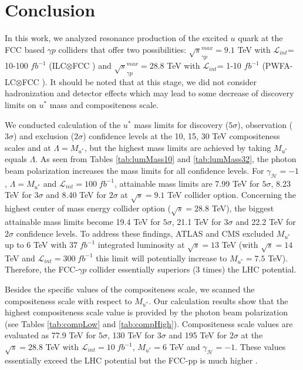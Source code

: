 \documentclass{appolb}
\begin{document}
\section{\label{sec:V}Conclusion}

In this work, we  analyzed  resonance production of the excited $u$ quark at the FCC based $\gamma p$ colliders that offer two possibilities: $\sqrt{s}^{max}_{\gamma p} = 9.1$ TeV with $\mathcal{L}_{int}$= 10-100 $fb^{-1}$ (ILC$\otimes$FCC ) and $\sqrt{s}^{max}_{\gamma p} = 28.8$ TeV with $\mathcal{L}_{int}$= 1-10 $fb^{-1}$ (PWFA-LC$\otimes$FCC ). It should be noted that at this stage, we did not consider hadronization and detector effects which may lead  to some decrease of discovery limits on $u^*$ mass and compositeness scale.

We conducted calculation of the $u^*$ mass limits for discovery ($5\sigma$), observation ($3\sigma$) and exclusion ($2\sigma$) confidence levels at the 10, 15, 30 TeV compositeness scales and at $\Lambda = M_{u^*}$, but the highest mass limits are achieved by taking $M_{u^*}$ equals  $\Lambda$. As seen from  Tables \ref{tab:lumMass10} and \ref{tab:lumMass32}, the photon beam polarization increases the mass limits for all confidence levels.  For $\gamma_{\mathcal{H}} = -1$, $\Lambda = M_{u^*}$ and $\mathcal{L}_{int} = 100 \;fb^{-1}$, attainable mass limits are  7.99 TeV for $5\sigma$, 8.23 TeV for $3\sigma$ and 8.40 TeV for $2\sigma$ at $\sqrt{s} = 9.1$ TeV collider option. Concerning the highest center of mass energy collider option ($\sqrt{s} = 28.8$ TeV),  the biggest attainable mass limits become  19.4 TeV for $5\sigma$, 21.1 TeV for $3\sigma$ and 22.2 TeV for $2\sigma$ confidence levels. To address these findings, ATLAS and CMS excluded $M_{u^*}$ up to 6 TeV with $37\;fb^{-1}$ integrated luminosity at $\sqrt{s} = 13$ TeV (with $\sqrt{s} = 14$ TeV and  $\mathcal{L}_{int} = 300 \;fb^{-1}$ this limit will potentially increase to $M_{u^*} = 7.5$ TeV). Therefore, the FCC-$\gamma p$ collider essentially superiors (3 times) the LHC potential.

Besides the specific values of the compositeness scale, we scanned the compositeness scale with respect to $M_{u^*}$. Our calculation results show that the highest compositeness scale  value is provided by the photon beam polarization (see Tables \ref{tab:compLow} and \ref{tab:compHigh}). Compositeness scale values are  evaluated as 77.9 TeV for $5\sigma$, 130 TeV for $3\sigma$ and 195 TeV for $2\sigma$ at the $\sqrt{s} = 28.8 $ TeV with  $\mathcal{L}_{int} = 10 \;fb^{-1}$, $M_{u^*} = 6 $ TeV and  $\gamma_{\mathcal{H}} = -1$. These values essentially exceed the LHC potential but the FCC-pp is much higher \cite{akay2017}.
\end{document}
